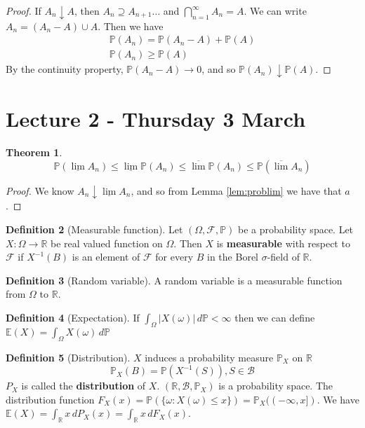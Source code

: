 \documentclass[10pt, oneside, reqno]{amsart}
\theoremstyle{plain}%
\newtheorem{thm}{Theorem}[section]
\theoremstyle{definition}
\newtheorem{defn}[thm]{Definition}
\theoremstyle{remark}
\newcommand{\sigf}{\mathcal{F}}
\newcommand{\R}{\mathbb{R}}
\newcommand{\E}{\mathbb{E}}
\renewcommand{\P}{\mathbb{P}}
\begin{document}
\begin{proof}
	If $A_n \downarrow A$, then $A_n \supseteq A_{n+1} \dots$ and $\bigcap_{n=1}^\infty A_n = A$.  We can write $A_n = (A_n - A) \cup A$.  Then we have 
	\begin{align*}
		\P(A_n) = \P(A_n - A) + \P(A) \\
		\P(A_n) \geq \P(A)
	\end{align*}
	By the continuity property, $\P(A_n - A) \rightarrow 0$, and so $\P(A_n) \downarrow \P(A)$.
\end{proof}


\section{Lecture 2 - Thursday 3 March} %
\label{sec:lecture_2_thursday_3_march}
\begin{thm}
	\[
		\P( \underline{\lim} A_n ) \leq \underline{\lim} \P(A_n) \leq \overline{\lim} \P(A_n) \leq \P( \overline{\lim} A_n )	
	\]
\end{thm}
\begin{proof}
	We know $A_n \downarrow \underline{\lim} A_n$, and so from Lemma \ref{lem:problim} we have that $a$.
\end{proof}

\begin{defn}[Measurable function]
	Let $(\Omega, \sigf, \P)$ be a probability space.  Let $X : \Omega \rightarrow \R$ be real valued function on $\Omega$.  Then $X$ is \textbf{measurable} with respect to $\sigf$ if $X^{-1}(B)$ is an element of $\sigf$ for every $B$ in the Borel $\sigma$-field of $\R$. 
\end{defn}

\begin{defn}[Random variable]
	A random variable is a measurable function from $\Omega$ to $\R$.  
\end{defn}

\begin{defn}[Expectation]
	If $\int_\Omega | X(\omega) | \, d\P < \infty$ then we can define $\E(X) = \int_\Omega X(\omega) \, d \P$
\end{defn}

\begin{defn}[Distribution]
	$X$ induces a probability measure $\P_X$ on $\R$\[
		\P_X(B) = \P(X^{-1}(S)), S \in \mathcal{B}
	\]
	$P_X$ is called the \textbf{distribution} of $X$.  $(\R, \mathcal{B}, \P_X)$ is a probability space.
	The distribution function $F_X(x) = \P( \{ \omega : X(\omega) \leq x \} ) = \P_X( (-\infty, x] )$.  
	We have $\E(X) = \int_\R x \, dP_X(x) = \int_\R x \, dF_X(x)$.
\end{defn}
\end{document}
